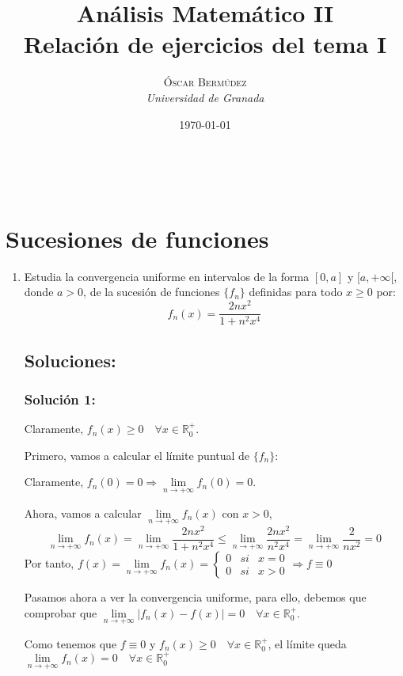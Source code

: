 \documentclass[a4paper, 11pt]{article} %
\title{\textbf{Análisis Matemático II}\\ %
Relación de ejercicios del tema I} %
\author{\textsc{Óscar Bermúdez} %
\\{\textit{Universidad de Granada}}} %
\date{\today} %
\makeatletter
\renewcommand{\maketitle}{ %
\begin{center} %
{\LARGE\@title} %
\end{center}
\vspace{50pt} %
\begin{flushright}
{\large\@author} %
\\\@date %

\vspace{40pt} %
\end{flushright}
}
\makeatother
\begin{document}
\maketitle %

\section*{Sucesiones de funciones}
\begin{enumerate}
	\item Estudia la convergencia uniforme en intervalos de la forma $[0,a]$ y $[a, +\infty[$,
	donde $a > 0$, de la sucesión de funciones $\{f_n\}$ definidas para todo $x \geq 0$ por:
	$$f_n(x) = \frac{2nx^2}{1+n^2x^4}$$
	\subsection*{Soluciones:}
		\subsubsection*{Solución 1:}
		Claramente, $f_n(x) \geq 0 \quad \forall x \in \mathbb{R}^+_0$.
		
		Primero, vamos a calcular el límite puntual de $\{f_n\}$:
		
		Claramente, $f_n(0) = 0  \Rightarrow \lim\limits_{n \rightarrow +\infty} f_n(0) = 0$.
		
		Ahora, vamos a calcular $\lim\limits_{n \rightarrow +\infty} f_n(x)$ con $x > 0$,
		$$\lim\limits_{n \rightarrow +\infty} f_n(x) = \lim\limits_{n \rightarrow +\infty}
		\frac{2nx^2}{1+n^2x^4} \leq  \lim\limits_{n \rightarrow +\infty} \frac{2nx^2}{n^2x^4}
		= \lim\limits_{n \rightarrow +\infty} \frac{2}{nx^2} = 0$$
		Por tanto, $f(x) = \lim\limits_{n \rightarrow +\infty} f_n(x) =
		\left\{\begin{array}{ccc}
			0 &   si  & x = 0 \\
  			0 &  si & x > 0
  		\end{array}\right. \Rightarrow f \equiv 0$
  		
  		Pasamos ahora a ver la convergencia uniforme, para ello, debemos que comprobar que
  		$\lim\limits_{n \rightarrow +\infty} |f_n(x)-f(x)| = 0 \quad \forall x \in \mathbb{R}^+_0$.
  		
  		Como tenemos que $f \equiv 0$ y $f_n(x) \geq 0 \quad \forall x \in \mathbb{R}^+_0$,
  		el límite queda $\lim\limits_{n \rightarrow +\infty} f_n(x) = 0 \quad \forall x \in \mathbb{R}^+_0$
  		

\end{enumerate}
\end{document}
